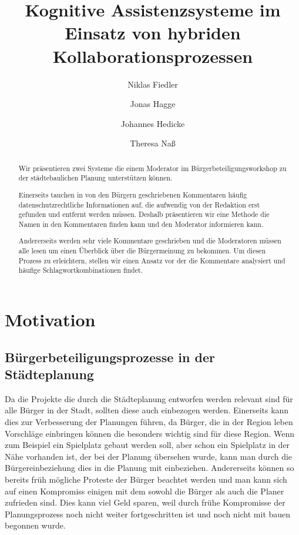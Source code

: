 \documentclass[runningheads]{llncs}
\begin{document}
%
\title{Kognitive Assistenzsysteme im Einsatz von hybriden Kollaborationsprozessen}
%
%
\author{Niklas Fiedler \and
Jonas Hagge \and
Johannes Hedicke \and
Theresa Naß }
%
%
%
\maketitle              %
%
\begin{abstract}
Wir präsentieren zwei Systeme die einem Moderator im Bürgerbeteiligungsworkshop zu der städtebaulichen Planung unterstützen können.

Einerseits tauchen in von den Bürgern geschriebenen Kommentaren häufig datenschutzrechtliche Informationen auf, die aufwendig von der Redaktion erst gefunden und entfernt werden müssen.
Deshalb präsentieren wir eine Methode die Namen in den Kommentaren finden kann und den Moderator informieren kann.

Andererseits werden sehr viele Kommentare geschrieben und die Moderatoren müssen alle lesen um einen Überblick über die Bürgermeinung zu bekommen. 
Um diesen Prozess zu erleichtern, stellen wir einen Ansatz vor der die Kommentare analysiert und häufige Schlagwortkombinationen findet.

\end{abstract}
%
%
%
\section{Motivation}
\subsection{Bürgerbeteiligungsprozesse in der Städteplanung}
Da die Projekte die durch die Städteplanung entworfen werden relevant sind für alle Bürger in der Stadt, sollten diese auch einbezogen werden.
Einerseits kann dies zur Verbesserung der Planungen führen, da Bürger, die in der Region leben Vorschläge einbringen können die besonders wichtig sind für diese Region.
Wenn zum Beispiel ein Spielplatz gebaut werden soll, aber schon ein Spielplatz in der Nähe vorhanden ist, der bei der Planung übersehen wurde, kann man durch die Bürgereinbeziehung dies in die Planung mit einbeziehen.
Andererseits können so bereits früh mögliche Proteste der Bürger beachtet werden und man kann sich auf einen Kompromiss einigen mit dem sowohl die Bürger als auch die Planer zufrieden sind.
Dies kann viel Geld sparen, weil durch frühe Kompromisse der Planungsprozess noch nicht weiter fortgeschritten ist und noch nicht mit bauen begonnen wurde.
\end{document}
